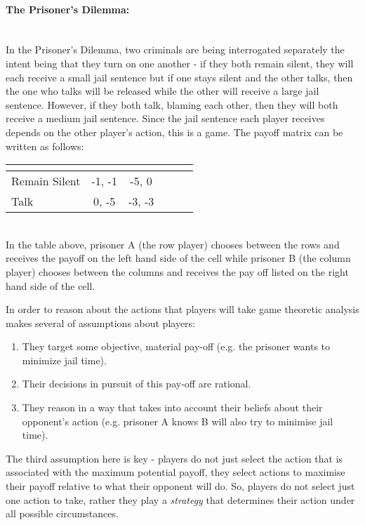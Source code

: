 \documentclass[11pt]{article}
\newcommand*{\np}{\par\noindent\newline}
\begin{document}
\paragraph{The Prisoner's Dilemma:}\mbox{}\\
In the Prisoner's Dilemma, two criminals are being interrogated
separately the intent being that they turn on one another - if they both
remain silent, they will each receive a small jail sentence but if one
stays silent and the other talks, then the one who talks will be released while
the other will receive a large jail sentence. However, if they both
talk, blaming each other, then they will both receive a medium jail sentence.
Since the jail sentence each player receives depends on the other player's
action, this is a game. The payoff matrix can be written as follows:
\begin{center}
   \begin{tabular}{|l||*{5}{c|}}\hline
	\label{prisoner_payoff}
	\backslashbox{Prisoner A}{Prisoner B}
	&\makebox[7em]{Remain Silent}&\makebox[7em]{Talk}\\\hline\hline
	Remain Silent & -1, -1 & -5, 0\\\hline
	Talk & 0, -5 & -3, -3 \\\hline
	\end{tabular}
\end{center}\mbox{}\\
In the table above, prisoner A (the row player) chooses between the rows and
receives the payoff on the left hand side of the cell while prisoner B (the
column player) chooses between the columns and receives the pay off listed on
the right hand side of the cell.
\np In order to reason about the actions that players will take game theoretic
analysis makes several of assumptions about players:
\begin{enumerate}
    \item They target some objective, material pay-off (e.g. the prisoner wants
    to minimize jail time).
    \item Their decisions in pursuit of this pay-off are rational.
    \item They reason in a way that takes into account their beliefs about
    their opponent's action (e.g. prisoner A knows B will also try to minimise
    jail time). 
\end{enumerate}
\cite{osborne_course_1994}
\np The third assumption here is key - players do not just select the action
that is associated with the maximum potential payoff, they select actions to
maximise their payoff relative to what their opponent will do. So, players do
not select just one action to take, rather they play a \textit{strategy} that
determines their action under all possible circumstances.
\end{document}
